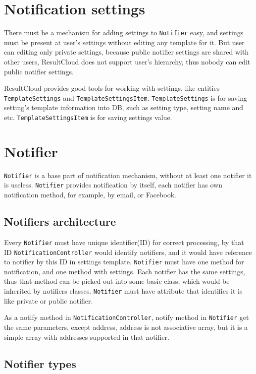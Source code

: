 \section{Notification settings}

There must be a mechanism for adding settings to \texttt{Notifier} easy, and settings must be present at user's settings without editing any template for it. But user can editing only private settings, because public notifier settings are shared with other users, ResultCloud does not support user's hierarchy, thus nobody can edit public notifier settings.

ResultCloud provides good tools for working with settings, like entities \texttt{TemplateSettings} and \texttt{TemplateSettingsItem}. \texttt{TemplateSettings} is for saving setting's template information into DB, such as setting type, setting name and etc. \texttt{TemplateSettingsItem} is for saving settings value.

\section{Notifier}

\texttt{Notifier} is a base part of notification mechanism, without at least one notifier it is useless. \texttt{Notifier} provides notification by itself, each notifier has own notification method, for example, by email, or Facebook.

\subsection{Notifiers architecture}

Every \texttt{Notifier} must have unique identifier(ID) for correct processing, by that ID \texttt{Notifica\-tion\-Controller} would identify notifiers, and it would have reference to notifier by this ID in settings template. \texttt{Notifier} must have one method for notification, and one method with settings. Each notifier has the same settings, thus that method can be picked out into some basic class, which would be inherited by notifiers classes. \texttt{Notifier} must have attribute that identifies it is like private or public notifier.

As a notify method in \texttt{NotificationController}, notify method in \texttt{Notifier} get the same parameters, except address, address is not associative array, but it is a simple array with addresses supported in that notifier. 

\subsection{Notifier types}

